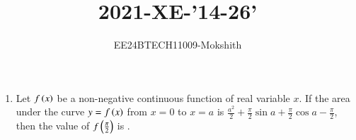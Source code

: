 \documentclass[journal]{IEEEtran}
\begin{document}

\title{2021-XE-'14-26'}
\author{EE24BTECH11009-Mokshith}
{\let\newpage\relax\maketitle}
\renewcommand{\thefigure}{\theenumi}
\renewcommand{\thetable}{\theenumi}
\setlength{\intextsep}{10pt} %
\renewcommand{\thetable}{\theenumi
}
\begin{enumerate}[start=4]
\item Let $f\left(x\right)$ be a non-negative continuous function of real variable $x$. If the area under the curve $y = f\left(x\right)$ from $x = 0$ to $x = a$ is $\frac{a^2}{2} + \frac{\pi}{2}\sin a + \frac{\pi}{2}\cos a - \frac{\pi}{2}$, then the value of $f\left(\frac{\pi}{2}\right)$ is \underline{\hspace{1cm}}.


\end{enumerate}
\end{document}
